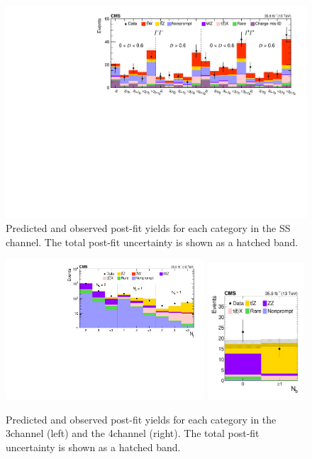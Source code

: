 \begin{figure}
  \centering
  \includegraphics[width=\textwidth]{figures/thirteen-TeV/postfit-2lss}
  \caption[Post-fit yields for each category in the SS \ttW channel]{Predicted and observed post-fit
  yields for each category in the SS \ttW channel. The total post-fit uncertainty is shown as a
  hatched band.}
    \label{fig:13-postfit-ttW}
\end{figure}
\begin{figure}
  \centering
  \includegraphics[width=0.66\textwidth]{figures/thirteen-TeV/postfit-3l}
  \includegraphics[width=0.32\textwidth]{figures/thirteen-TeV/postfit-4l}
  \caption[Post-fit yields for each category in the 3\lep \ttZ channel]{Predicted and observed post-fit yields for each category in the 3\lep \ttZ channel (left) and the 4\lep \ttZ channel (right). The total post-fit uncertainty is shown as a hatched band.}
  \label{fig:13-postfit-ttZ}
\end{figure}
